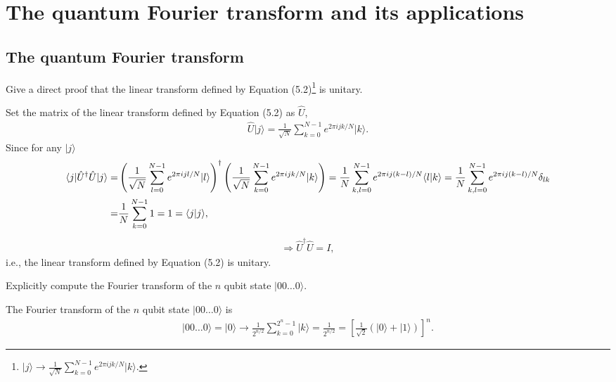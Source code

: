 \documentclass[en]{sol-man}
\begin{document}
\fi
\chapter{The quantum Fourier transform and its applications}

\section{The quantum Fourier transform}

\begin{exe}
    Give a direct proof that the linear transform defined by Equation (5.2)\footnote{\label{Equ-5.2}$\lvert j\rangle\longrightarrow\frac{1}{\sqrt{N}}\sum_{k=0}^{N-1}e^{2\pi ijk/N}\lvert k\rangle$.} is unitary.
\end{exe}
\begin{pf}
    Set the matrix of the linear transform defined by Equation (5.2) as $\hat{U}$,
    \begin{align}
        \hat{U}\lvert j\rangle=\frac{1}{\sqrt{N}}\sum_{k=0}^{N-1}e^{2\pi ijk/N}\lvert k\rangle.
    \end{align}
    Since for any $\lvert j\rangle$
    \begin{align}
        \notag\langle j\rvert\hat{U}^{\dagger}\hat{U}\lvert j\rangle=&\left(\frac{1}{\sqrt{N}}\sum_{l=0}^{N-1}e^{2\pi ijl/N}\lvert l\rangle\right)^{\dagger}\left(\frac{1}{\sqrt{N}}\sum_{k=0}^{N-1}e^{2\pi ijk/N}\lvert k\rangle\right)=\frac{1}{N}\sum_{k,l=0}^{N-1}e^{2\pi ij(k-l)/N}\langle l\vert k\rangle=\frac{1}{N}\sum_{k,l=0}^{N-1}e^{2\pi ij(k-l)/N}\delta_{lk}\\
        =&\frac{1}{N}\sum_{k=0}^{N-1}1=1=\langle j\vert j\rangle,
    \end{align}
    \begin{align}
        \Longrightarrow\hat{U}^{\dagger}\hat{U}=I,
    \end{align}
    i.e., the linear transform defined by Equation (5.2) is unitary.
\end{pf}

\begin{exe}
    Explicitly compute the Fourier transform of the $n$ qubit state $\lvert 00\dots 0\rangle$.
\end{exe}
\begin{sol}
    The Fourier transform of the $n$ qubit state $\lvert 00\dots 0\rangle$ is
    \begin{align}
        \lvert 00\dots 0\rangle=\lvert 0\rangle\longrightarrow\frac{1}{2^{n/2}}\sum_{k=0}^{2^n-1}\lvert k\rangle=\frac{1}{2^{n/2}}=\left[\frac{1}{\sqrt{2}}(\lvert 0\rangle+\lvert 1\rangle)\right]^n.
    \end{align}
\end{sol}

\ifx\allfiles\undefined
\end{document}
